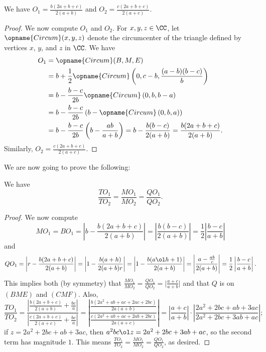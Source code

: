 \documentclass[11pt]{scrartcl}
\begin{document}
\begin{claim*}
  We have $O_1 = \frac{b(2a+b+c)}{2(a+b)}$
  and $O_2 = \frac{c(2a+b+c)}{2(a+c)}$.
\end{claim*}
\begin{proof}
  We now compute $O_1$ and $O_2$.
  For $x,y,z\in\CC$, let $\opname{Circum}(x,y,z)$
  denote the circumcenter of the triangle
  defined by vertices $x$, $y$, and $z$ in $\CC$. We have
  \begin{align*}
  O_1&=\opname{Circum}(B,M,E)\\
  &=b+\frac12\opname{Circum}\left(0,c-b,\frac{(a-b)(b-c)}b\right)\\
  &=b-\frac{b-c}{2b}\opname{Circum}\left(0,b,b-a\right)\\
  &=b-\frac{b-c}{2b}\left(b-\opname{Circum}\left(0,b,a\right)\right)\\
  &=b-\frac{b-c}{2b}\left(b-\frac{ab}{a+b}\right)=b-\frac{b(b-c)}{2(a+b)}=\frac{b(2a+b+c)}{2(a+b)}.
  \end{align*}
  Similarly, $O_2=\frac{c(2a+b+c)}{2(a+c)}$.
\end{proof}

We are now going to prove the following:
\begin{claim*}
  We have
  \[\frac{TO_1}{TO_2}=\frac{MO_1}{MO_2}=\frac{QO_1}{QO_2}.\]
\end{claim*}
\begin{proof}
  We now compute
  \[MO_1=BO_1=\left|b-\frac{b(2a+b+c)}{2(a+b)}\right|
    =\left|\frac{b(b-c)}{2(a+b)}\right|=\frac12\left|\frac{b-c}{a+b}\right|\]
  and
  \[QO_1=\left|r-\frac{b(2a+b+c)}{2(a+b)}\right|
    =\left|1-\frac{b(a+h)}{2(a+b)r}\right|=\left|1-\frac{b(a\ol h+1)}{2(a+b)}\right|
    =\left|\frac{a-\frac{ab}c}{2(a+b)}\right|=\frac12\left|\frac{b-c}{a+b}\right|.\]
  This implies both (by symmetry) that
  $\frac{MO_1}{MO_2}=\frac{QO_1}{QO_2}=\big|\frac{a+c}{a+b}\big|$
  and that $Q$ is on $(BME)$ and $(CMF)$.
  Also,
  \[\frac{TO_1}{TO_2}
    =\frac{\left|\frac{b(2a+b+c)}{2(a+b)}+\frac{bc}a\right|}%
    {\left|\frac{c(2a+b+c)}{2(a+c)}+\frac{bc}a\right|}
    =\left|\frac{\frac{b(2a^2+ab+ac+2ac+2bc)}{2a(a+b)}}{\frac{c(2a^2+ab+ac+2ab+2bc)}{2a(a+c)}}\right|
    =\left|\frac{a+c}{a+b}\right|\cdot\left|\frac{2a^2+2bc+ab+3ac}{2a^2+2bc+3ab+ac}\right|;\]
  if $z=2a^2+2bc+ab+3ac$, then $a^2bc\ol z=2a^2+2bc+3ab+ac$, so the second
  term has magnitude $1$.
  This means $\frac{TO_1}{TO_2}=\frac{MO_1}{MO_2}=\frac{QO_1}{QO_2}$, as desired.
\end{proof}
\end{document}
